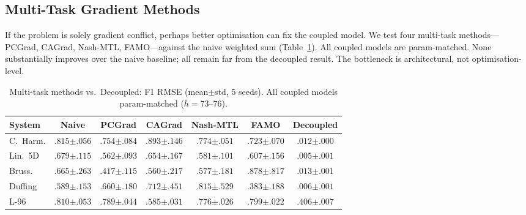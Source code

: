 \documentclass{article}
\begin{document}
\subsection{Multi-Task Gradient Methods}
\label{sec:mtl}

If the problem is solely gradient conflict, perhaps better
optimisation can fix the coupled model.  We test four multi-task methods---PCGrad,
CAGrad, Nash-MTL, FAMO---against the naive weighted sum
(Table~\ref{tab:mtl}).  All coupled models are param-matched.
None substantially improves over the naive baseline; all remain
far from the decoupled result.  The bottleneck is architectural,
not optimisation-level.

\begin{table}[H]
\caption{Multi-task methods vs.\ Decoupled: F1 RMSE (mean$\pm$std, 5 seeds).
All coupled models param-matched ($h{=}73$--$76$).}
\label{tab:mtl}
\centering
\small
\setlength{\tabcolsep}{2.5pt}
\begin{tabular}{l cccccc}
\toprule
System & Naive & \shortstack{PCGrad\\\citep{yu2020gradient}} & \shortstack{CAGrad\\\citep{liu2021conflict}} & \shortstack{Nash-MTL\\\citep{navon2022multi}} & \shortstack{FAMO\\\citep{liu2024famo}} & Decoupled \\
\midrule
C.~Harm.
  & $.815{\scriptstyle\pm.056}$
  & $.754{\scriptstyle\pm.084}$
  & $.893{\scriptstyle\pm.146}$
  & $.774{\scriptstyle\pm.051}$
  & $.723{\scriptstyle\pm.070}$
  & $\mathbf{.012}{\scriptstyle\pm.000}$ \\
Lin.~5D
  & $.679{\scriptstyle\pm.115}$
  & $.562{\scriptstyle\pm.093}$
  & $.654{\scriptstyle\pm.167}$
  & $.581{\scriptstyle\pm.101}$
  & $.607{\scriptstyle\pm.156}$
  & $\mathbf{.005}{\scriptstyle\pm.001}$ \\
Bruss.
  & $.665{\scriptstyle\pm.263}$
  & $.417{\scriptstyle\pm.115}$
  & $.560{\scriptstyle\pm.217}$
  & $.577{\scriptstyle\pm.181}$
  & $.878{\scriptstyle\pm.817}$
  & $\mathbf{.013}{\scriptstyle\pm.001}$ \\
Duffing
  & $.589{\scriptstyle\pm.153}$
  & $.660{\scriptstyle\pm.180}$
  & $.712{\scriptstyle\pm.451}$
  & $.815{\scriptstyle\pm.529}$
  & $.383{\scriptstyle\pm.188}$
  & $\mathbf{.006}{\scriptstyle\pm.001}$ \\
L-96
  & $.810{\scriptstyle\pm.053}$
  & $.789{\scriptstyle\pm.044}$
  & $.585{\scriptstyle\pm.031}$
  & $.776{\scriptstyle\pm.026}$
  & $.799{\scriptstyle\pm.022}$
  & $\mathbf{.406}{\scriptstyle\pm.007}$ \\
\bottomrule
\end{tabular}
\end{table}
\end{document}

